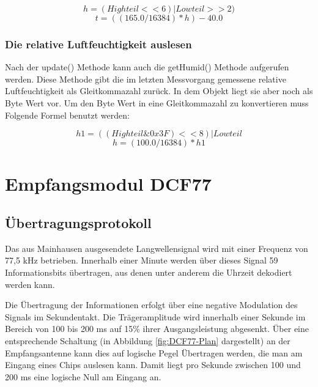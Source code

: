 				\[ h = (Highteil << 6) | Lowteil >> 2) \]
				\[ t = ((165.0 / 16384) * h) - 40.0 \]
				
			\cite{HYTManual}
			\subsubsection{Die relative Luftfeuchtigkeit auslesen}
				Nach der update() Methode kann auch die getHumid() Methode aufgerufen werden. Diese Methode gibt die im letzten Messvorgang gemessene relative Luftfeuchtigkeit als Gleitkommazahl zurück. In dem Objekt liegt sie aber noch als Byte Wert vor. Um den Byte Wert in eine Gleitkommazahl zu konvertieren muss Folgende Formel benutzt werden:
				
				\[ h1 = ((Highteil \& 0x3F) << 8) | Lowteil \]
				\[ h = (100.0 / 16384) * h1 \]
				
				\cite{HYTManual}
	\section{Empfangsmodul DCF77}
		\subsection{Übertragungsprotokoll}
			Das aus Mainhausen ausgesendete Langwellensignal wird mit einer Frequenz von 77,5 kHz betrieben. Innerhalb einer Minute werden über dieses Signal 59 Informationsbits übertragen, aus denen unter anderem die Uhrzeit dekodiert werden kann.
			
			Die Übertragung der Informationen erfolgt über eine negative Modulation des Signals im Sekundentakt. Die Trägeramplitude wird innerhalb einer Sekunde im Bereich von 100 bis 200 ms auf 15\% ihrer Ausgangsleistung abgesenkt. Über eine entsprechende Schaltung (in Abbildung \ref{fig:DCF77-Plan} dargestellt) an der Empfangsantenne kann dies auf logische Pegel Übertragen werden, die man am Eingang eines Chips auslesen kann. Damit liegt pro Sekunde zwischen 100 und 200 ms eine logische Null am Eingang an.
			

